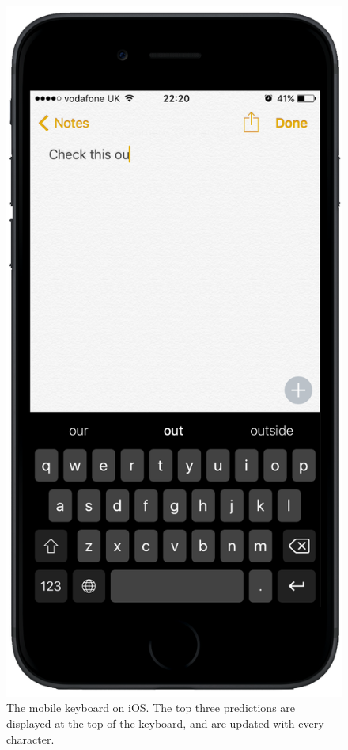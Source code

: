 \documentclass[a4paper, 12pt]{report}
\begin{document}
\begin{figure}[h]
\captionsetup{justification=centering}
\centering
\includegraphics[scale=0.25]{Images/MobileKeyboardOnScreen.png}
\caption{The mobile keyboard on iOS. The top three predictions are displayed at the top of the keyboard, and are updated with every character.}
\end{figure}
\end{document}
